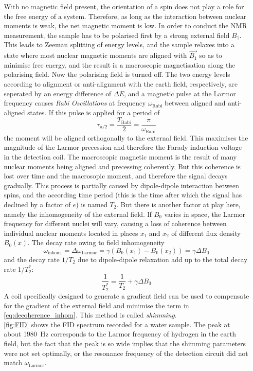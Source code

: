 \documentclass[
    parskip=half, 
    twoside=false,
    twocolumn=true,
    fontsize=11pt,
]{scrarticle}
\begin{document}
With no magnetic field present, the orientation of a spin does not play a role for the free energy of a system. Therefore, as long as the interaction between nuclear moments is weak, the net magnetic moment is low. In order to conduct the NMR measurement, the sample has to be polarised first by a strong external field $B_1$. This leads to Zeeman splitting of energy levels, and the sample relaxes into a state where most nuclear magnetic moments are aligned with $\vec{B_1}$ so as to minimise free energy, and the result is a macroscopic magnetisation along the polarising field. Now the polarising field is turned off. The two energy levels according to alignment or anti-alignment with the earth field, respectively, are seperated by an energy difference of $\Delta E$, and a magnetic pulse at the Larmor frequency causes \textit{Rabi Oscillations} at frequency $\omega_\text{Rabi}$ between aligned and anti-aligned states. If this pulse is applied for a period of
\begin{equation}
 \tau_{\pi/2} = \frac{T_\text{Rabi}}{2} = \frac{\pi}{\omega_\text{Rabi}}
\end{equation}
the moment will be aligned orthogonally to the external field. This maximises the magnitude of the Larmor precession and therefore the Farady induction voltage in the detection coil. The macroscopic magnetic moment is the result of many nuclear moments being aligned and precessing coherently. But this coherence is lost over time and the macrosopic moment, and therefore the signal decays gradually. This process is partially caused by dipole-dipole interaction between spins, and the according time period (this is the time after which the signal has declined by a factor of $e$) is named $T_2$. But there is another factor at play here, namely the inhomogeneity of the external field. If $B_0$ varies in space, the Larmor frequency for different nuclei will vary, causing a loss of coherence between individual nuclear moments located in places $x_1$ and $x_2$ of different flux density $B_0(x)$. The decay rate owing to field inhomogeneity
\begin{equation}
\label{eq:decoherence_inhom}
 \omega_\text{inhom.} = \Delta \omega_\text{Larmor} = \gamma (B_0(x_1) - B_0(x_2)) = \gamma \Delta B_0
\end{equation}
and the decay rate $1/T_2$ due to dipole-dipole relaxation add up to the total decay rate $1/T_2^*$:
\begin{equation}
 \frac{1}{T_2^*} = \frac{1}{T_2} + \gamma \Delta B_0
\end{equation}
A coil specifically designed to generate a gradient field can be used to compensate for the gradient of the external field and minimise the term in \autoref{eq:decoherence_inhom}. This method is called \textit{shimming}.\\
\autoref{fig:FID} shows the FID spectrum recorded for a water sample. The peak at about \SI{1980}{\hertz} corresponds to the Larmor frequency of hydrogen in the earth field, but the fact that the peak is so wide implies that the shimming parameters were not set optimally, or the resonance frequency of the detection circuit did not match $\omega_\text{Larmor}$.
\end{document}
